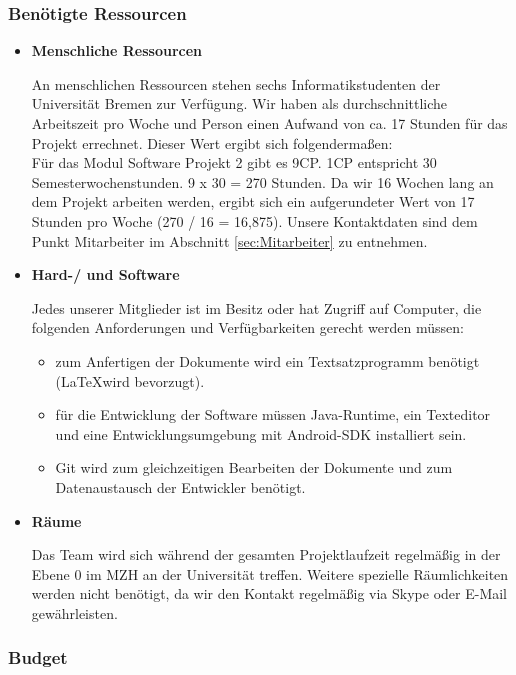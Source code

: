 \documentclass[fontsize=12pt,paper=a4,twoside]{scrartcl}
\begin{document}
\subsubsection{Benötigte Ressourcen}

\begin{itemize}
\item \textbf{Menschliche Ressourcen}

An menschlichen Ressourcen stehen sechs Informatikstudenten der Universität Bremen zur Verfügung. Wir haben als durchschnittliche Arbeitszeit pro Woche und Person einen Aufwand von ca. 17 Stunden für das Projekt errechnet. Dieser Wert ergibt sich folgendermaßen:\\
\newpage Für das Modul Software Projekt 2 gibt es 9CP. 1CP entspricht 30 Semesterwochenstunden. 9 x 30 = 270 Stunden. Da wir 16 Wochen lang an dem Projekt arbeiten werden, ergibt sich ein aufgerundeter Wert von 17 Stunden pro Woche (270 / 16 = 16,875). Unsere Kontaktdaten sind dem Punkt Mitarbeiter im Abschnitt \ref{sec:Mitarbeiter} zu entnehmen.

\item \textbf{Hard-/ und Software}

Jedes unserer Mitglieder ist im Besitz oder hat Zugriff auf Computer, die folgenden Anforderungen und Verfügbarkeiten gerecht werden müssen:

\begin{itemize}
\item zum Anfertigen der Dokumente wird ein Textsatzprogramm benötigt (\LaTeX wird bevorzugt).
\item für die Entwicklung der Software müssen Java-Runtime, ein Texteditor und eine Entwicklungsumgebung mit Android-SDK installiert sein.
\item Git wird zum gleichzeitigen Bearbeiten der Dokumente und zum Datenaustausch der Entwickler benötigt.
\end{itemize}

\item \textbf{Räume}

Das Team wird sich während der gesamten Projektlaufzeit regelmäßig in der Ebene 0 im MZH an der Universität treffen. Weitere spezielle Räumlichkeiten werden nicht benötigt, da wir den Kontakt regelmäßig via Skype oder E-Mail gewährleisten.

\end{itemize}

\subsubsection{Budget}
\end{document}
